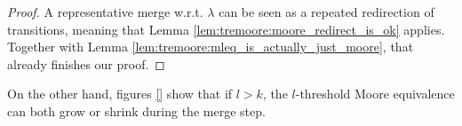 \begin{proof}
	A representative merge w.r.t. $\lambda$ can be seen as a repeated redirection of transitions, meaning that Lemma \ref{lem:tremoore:moore_redirect_is_ok} applies. Together with Lemma \ref{lem:tremoore:mleq_is_actually_just_moore}, that already finishes our proof.
\end{proof}

On the other hand, figures \ref{} show that if $l > k$, the $l$-threshold Moore equivalence can both grow or shrink during the merge step. %



























